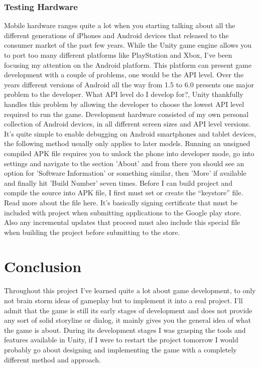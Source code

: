 \subsection{Testing Hardware}
Mobile hardware ranges quite a lot when you starting talking about all the different generations of iPhones and Android devices that released to the consumer market of the past few years. While the Unity game engine allows you to port too many different platforms like PlayStation and Xbox, I’ve been focusing my attention on the Android platform. This platform can present game development with a couple of problems, one would be the API level. Over the years different versions of Android all the way from 1.5 to 6.0 presents one major problem to the developer. What API level do I develop for?, Unity thankfully handles this problem by allowing the developer to choose the lowest API level required to run the game.
Development hardware consisted of my own personal collection of Android devices, in all different screen sizes and API level versions. It’s quite simple to enable debugging on Android smartphones and tablet devices, the following method usually only applies to later models. Running an unsigned compiled APK file requires you to unlock the phone into developer mode, go into settings and navigate to the section 'About' and from there you should see an option for 'Software Information' or something similar, then 'More' if available and finally hit 'Build Number' seven times. Before I can build project and compile the source into APK file, I first must set or create the “keystore” file. Read more about the file here. It’s basically signing certificate that must be included with project when submitting applications to the Google play store. Also any incremental updates that proceed must also include this special file when building the project before submitting to the store.
\chapter{Conclusion}
Throughout this project I've learned quite a lot about game development, to only not brain storm ideas of gameplay but to implement it into a real project. I'll admit that the game is still its early stages of development and does not provide any sort of solid storyline or dialog, it mainly gives you the general idea of what the game is about. During its development stages I was grasping the tools and features available in Unity, if I were to restart the project tomorrow I would probably go about designing and implementing the game with a completely different method and approach.

